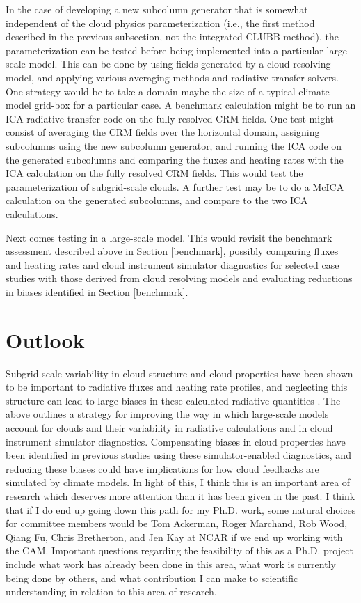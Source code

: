 \documentclass{article}
\begin{document}
In the case of developing a new subcolumn generator that is somewhat independent of the cloud physics parameterization (i.e., the first method described in the previous subsection, not the integrated CLUBB method), the parameterization can be tested before being implemented into a particular large-scale model. This can be done by using fields generated by a cloud resolving model, and applying various averaging methods and radiative transfer solvers. One strategy would be to take a domain maybe the size of a typical climate model grid-box for a particular case. A benchmark calculation might be to run an ICA radiative transfer code on the fully resolved CRM fields. One test might consist of averaging the CRM fields over the horizontal domain, assigning subcolumns using the new subcolumn generator, and running the ICA code on the generated subcolumns and comparing the fluxes and heating rates with the ICA calculation on the fully resolved CRM fields. This would test the parameterization of subgrid-scale clouds. A further test may be to do a McICA calculation on the generated subcolumns, and compare to the two ICA calculations.

Next comes testing in a large-scale model. This would revisit the benchmark assessment described above in Section \ref{benchmark}, possibly comparing fluxes and heating rates and cloud instrument simulator diagnostics for selected case studies with those derived from cloud resolving models and evaluating reductions in biases identified in Section \ref{benchmark}.

\section{Outlook}
Subgrid-scale variability in cloud structure and cloud properties have been shown to be important to radiative fluxes and heating rate profiles, and neglecting this structure can lead to large biases in these calculated radiative quantities \citep{barker_et_al_1999}. The above outlines a strategy for improving the way in which large-scale models account for clouds and their variability in radiative calculations and in cloud instrument simulator diagnostics. Compensating biases in cloud properties have been identified in previous studies using these simulator-enabled diagnostics, and reducing these biases could have implications for how cloud feedbacks are simulated by climate models. In light of this, I think this is an important area of research which deserves more attention than it has been given in the past. I think that if I do end up going down this path for my Ph.D. work, some natural choices for committee members would be Tom Ackerman, Roger Marchand, Rob Wood, Qiang Fu, Chris Bretherton, and Jen Kay at NCAR if we end up working with the CAM. Important questions regarding the feasibility of this as a Ph.D. project include what work has already been done in this area, what work is currently being done by others, and what contribution I can make to scientific understanding in relation to this area of research. 


\end{document}
